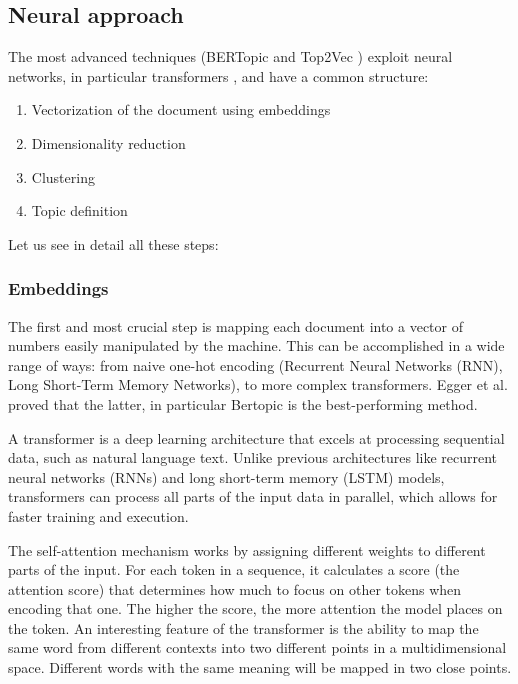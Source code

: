 \subsection{Neural approach}

The most advanced techniques (BERTopic \cite{grootendorst_bertopic_2022}and Top2Vec \cite{angelov_top2vec_2020})  exploit neural networks, in particular transformers \cite{vaswani_attention_2017}, and have a common structure: 

\begin{enumerate}
    \item Vectorization of the document using embeddings
    \item Dimensionality reduction
    \item Clustering
    \item Topic definition
\end{enumerate}

Let us see in detail all these steps:

\subsubsection{Embeddings}

The first and most crucial step is mapping each document into a vector of numbers  easily manipulated by the machine. This can be accomplished in a wide range of  ways: from naive one-hot encoding (Recurrent Neural Networks (RNN), Long Short-Term Memory Networks), to more complex transformers. Egger et al. \cite{egger_topic_2022} proved that the latter, in particular Bertopic is the best-performing method.

A transformer \cite{vaswani_attention_2017}  is a deep learning architecture that excels at processing sequential data, such as natural language text. Unlike previous architectures like recurrent neural networks (RNNs) and long short-term memory (LSTM) models, transformers can process all parts of the input data in parallel, which allows for faster training and execution.

The self-attention mechanism works by assigning different weights to different parts of the input. For each token in a sequence, it calculates a score (the attention score) that determines how much to focus on other tokens when encoding that one. The higher the score, the more attention the model places on the token. An interesting feature of the transformer is the ability to map the same word from different contexts into two different points in a multidimensional space. Different words with the same meaning will be mapped in two close points.

